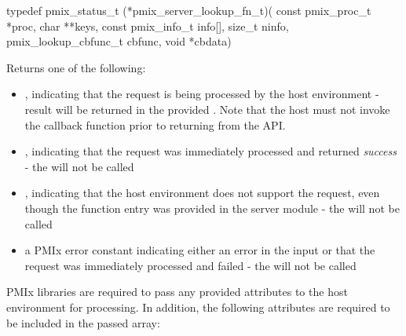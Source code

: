 \format

\cspecificstart
\begin{codepar}
typedef pmix_status_t (*pmix_server_lookup_fn_t)(
                             const pmix_proc_t *proc,
                             char **keys,
                             const pmix_info_t info[],
                             size_t ninfo,
                             pmix_lookup_cbfunc_t cbfunc,
                             void *cbdata)
\end{codepar}
\cspecificend

\begin{arglist}
\end{arglist}

Returns one of the following:

\begin{itemize}
    \item {}, indicating that the request is being processed by the host environment - result will be returned in the provided . Note that the host must not invoke the callback function prior to returning from the \ac{API}.
    \item {}, indicating that the request was immediately processed and returned \textit{success} - the  will not be called
    \item {}, indicating that the host environment does not support the request, even though the function entry was provided in the server module - the  will not be called
    \item a PMIx error constant indicating either an error in the input or that the request was immediately processed and failed - the  will not be called
\end{itemize}

\reqattrstart
\ac{PMIx} libraries are required to pass any provided attributes to the host environment for processing. In addition, the following attributes are required to be included in the passed  array:

